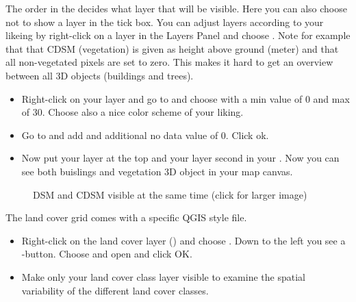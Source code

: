 \documentclass[letterpaper,10pt,english]{sphinxmanual}
\begin{document}
The order in the  decides what layer that will be visible. Here you can also choose not to show a layer in the tick box. You can adjust layers according to your likeing by right-click on a layer in the Layers Panel and choose . Note for example that that CDSM (vegetation) is given as height above ground (meter) and that all non-vegetated pixels are set to zero. This makes it hard to get an overview between all 3D objects (buildings and trees).
\begin{itemize}
\item {} 
Right-click on your  layer and go to  and choose  with a min value of 0 and max of 30. Choose also a nice color scheme of your liking.

\item {} 
Go to  and  add and additional no data value of 0. Click ok.

\item {} 
Now put your  layer at the top and your  layer second in your . Now you can see both buislings and vegetation 3D object in your map canvas.

\end{itemize}

\begin{figure}[htbp]
\centering
\capstart

\noindent{}
\caption{DSM and CDSM visible at the same time (click for larger image)}\label{\detokenize{Tutorials/SuewsSpatial:id7}}\end{figure}

The land cover grid comes with a specific QGIS style file.
\begin{itemize}
\item {} 
Right-click on the land cover layer () and choose . Down to the left you see a -button. Choose  and open  and click OK.

\item {} 
Make only your land cover class layer visible to examine the spatial variability of the different land cover classes.

\end{itemize}
\end{document}
